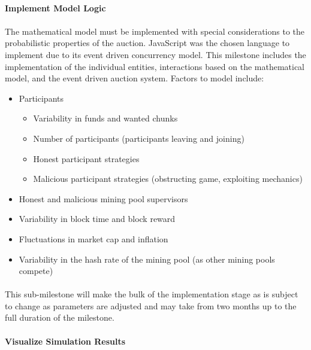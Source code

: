 \paragraph{Implement Model Logic}

\paragraph{} The mathematical model must be implemented with special considerations to the probabilistic properties of the auction.  JavaScript was the chosen language to implement due to its event driven concurrency model. This milestone includes the implementation of the individual entities, interactions based on the mathematical model, and the event driven auction system. Factors to model include:

\begin{itemize}
  \item Participants
    \begin{itemize}
      \item Variability in funds and wanted chunks
      \item Number of participants (participants leaving and joining)
      \item Honest participant strategies
      \item Malicious participant strategies (obstructing game, exploiting mechanics)
    \end{itemize}
  \item Honest and malicious mining pool supervisors
  \item Variability in block time and block reward
  \item Fluctuations in market cap and inflation
  \item Variability in the hash rate of the mining pool (as other mining pools compete)
\end{itemize}

\paragraph{} This sub-milestone will make the bulk of the implementation stage as is subject to change as parameters are adjusted and may take from two months up to the full duration of the milestone.

\paragraph{Visualize Simulation Results}

